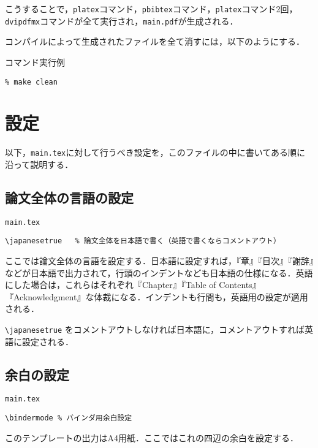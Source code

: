 こうすることで，\verb|platex|コマンド，\verb|pbibtex|コマンド，\verb|platex|コマンド2回，\verb|dvipdfmx|コマンドが全て実行され，\texttt{main.pdf}が生成される．

コンパイルによって生成されたファイルを全て消すには，以下のようにする．

\begin{itembox}[l]{コマンド実行例}
\begin{verbatim}
% make clean
\end{verbatim}
\end{itembox}

\section{設定}

以下，\texttt{main.tex}に対して行うべき設定を，このファイルの中に書いてある順に沿って説明する．

\subsection{論文全体の言語の設定}
\label{sec:lang}

\begin{itembox}[l]{\texttt{main.tex}}
\begin{verbatim}
\japanesetrue	% 論文全体を日本語で書く（英語で書くならコメントアウト）
\end{verbatim}
\end{itembox}

ここでは論文全体の言語を設定する．日本語に設定すれば，『章』『目次』『謝辞』などが日本語で出力されて，行頭のインデントなども日本語の仕様になる．英語にした場合は，これらはそれぞれ『Chapter』『Table of Contents』『Acknowledgment』な体裁になる．インデントも行間も，英語用の設定が適用される．

\verb|\japanesetrue| をコメントアウトしなければ日本語に，コメントアウトすれば英語に設定される．


\subsection{余白の設定}

\begin{itembox}[l]{\texttt{main.tex}}
\begin{verbatim}
\bindermode	% バインダ用余白設定
\end{verbatim}
\end{itembox}

このテンプレートの出力はA4用紙．ここではこれの四辺の余白を設定する．

